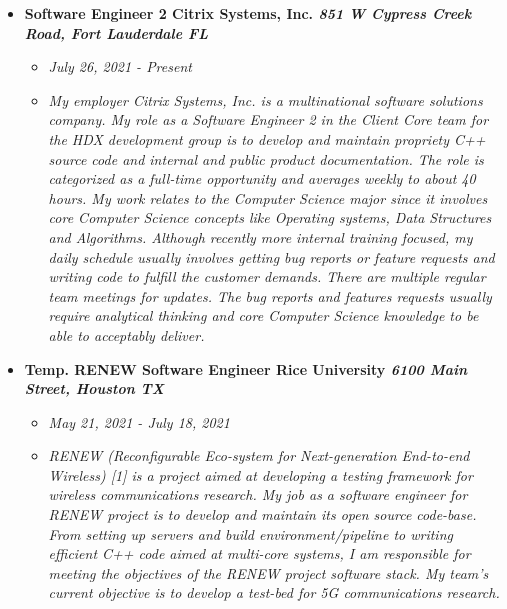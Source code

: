 \documentclass[12]{Resume}
\begin{document}
\begin{itemize}[noitemsep,nolistsep]
    \item[\textbullet]\textbf{\normalsize{Software Engineer 2 \hfill Citrix Systems, Inc.} \footnotesize{\textit{851 W Cypress Creek Road, Fort Lauderdale FL}}}
        \begin{itemize}[leftmargin=*]
            \setlength\itemsep{-0.25em}
            \item[]\small{\textit{July 26, 2021 - Present}}
            \item[]\small{\textit{My employer Citrix Systems, Inc. is a multinational software solutions company. My role as a Software Engineer 2 in the Client Core team for the HDX development group is to develop and maintain propriety C++ source code and internal and public product documentation. The role is categorized as a full-time opportunity and averages weekly to about 40 hours. My work relates to the Computer Science major since it involves core Computer Science concepts like Operating systems, Data Structures and Algorithms. Although recently more internal training focused, my daily schedule usually involves getting bug reports or feature requests and writing code to fulfill the customer demands. There are multiple regular team meetings for updates. The bug reports and features requests usually require analytical thinking and core Computer Science knowledge to be able to acceptably deliver.}}
        \end{itemize}
    \item[\textbullet]\textbf{\normalsize{Temp. RENEW Software Engineer \hfill Rice University} \footnotesize{\textit{6100 Main Street, Houston TX}}}
        \begin{itemize}[leftmargin=*]
            \setlength\itemsep{-0.25em}
            \item[]\small{\textit{May 21, 2021 - July 18, 2021}}
            \item[]\small{\textit{RENEW (Reconfigurable Eco-system for Next-generation End-to-end Wireless) [1] is a project aimed at developing a testing framework for wireless communications research. My job as a software engineer for RENEW project is to develop and maintain its open source code-base. From setting up servers and build environment/pipeline to writing efficient C++ code aimed at multi-core systems, I am responsible for meeting the objectives of the RENEW project software stack. My team's current objective is to develop a test-bed for 5G communications research.}}
        \end{itemize}
\end{itemize}
\end{document}
